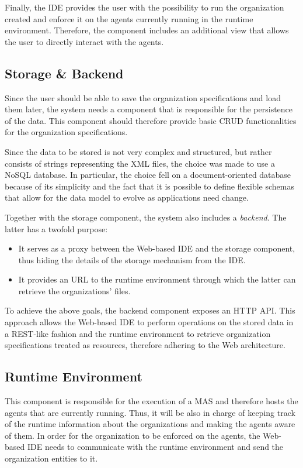 Finally, the IDE provides the user with the possibility to run the organization created and enforce it on the agents currently running in the runtime environment.
Therefore, the component includes an additional view that allows the user to directly interact with the agents.

\subsection{Storage \& Backend}
Since the user should be able to save the organization specifications and load them later, the system needs a component that is responsible for the persistence of the data.
This component should therefore provide basic CRUD functionalities for the organization specifications.

Since the data to be stored is not very complex and structured, but rather consists of strings representing the XML files, the choice was made to use a NoSQL database.
In particular, the choice fell on a document-oriented database because of its simplicity and the fact that it is possible to define flexible schemas that allow for the data model to evolve as applications need change.

Together with the storage component, the system also includes a \textit{backend}.
The latter has a twofold purpose:
\begin{itemize}
    \item It serves as a proxy between the Web-based IDE and the storage component, thus hiding the details of the storage mechanism from the IDE.
    \item It provides an URL to the runtime environment through which the latter can retrieve the organizations' files.
\end{itemize}
To achieve the above goals, the backend component exposes an HTTP API.
This approach allows the Web-based IDE to perform operations on the stored data in a REST-like fashion and the runtime environment to retrieve organization specifications treated as resources, therefore adhering to the Web architecture.

\subsection{Runtime Environment}
This component is responsible for the execution of a MAS and therefore hosts the agents that are currently running.
Thus, it will be also in charge of keeping track of the runtime information about the organizations and making the agents aware of them.
In order for the organization to be enforced on the agents, the Web-based IDE needs to communicate with the runtime environment and send the organization entities to it.


